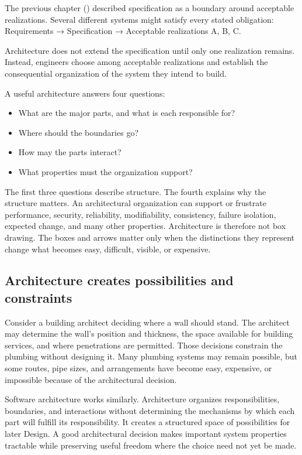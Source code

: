 The previous chapter (\citet{ch-specification}) described specification as a boundary around acceptable
realizations. Several different systems might satisfy every stated obligation: Requirements →
Specification → Acceptable realizations A, B, C.

Architecture does not extend the specification until only one realization remains. Instead,
engineers choose among acceptable realizations and establish the consequential organization of the
system they intend to build.

A useful architecture answers four questions:

\begin{itemize}
\tightlist
\item
  What are the major parts, and what is each responsible for?
\item
  Where should the boundaries go?
\item
  How may the parts interact?
\item
  What properties must the organization support?
\end{itemize}

The first three questions describe structure. The fourth explains why the structure matters. An
architectural organization can support or frustrate performance, security, reliability,
modifiability, consistency, failure isolation, expected change, and many other properties.
Architecture is therefore not box drawing. The boxes and arrows matter only when the distinctions
they represent change what becomes easy, difficult, visible, or expensive.

\subsection{Architecture creates possibilities and constraints}\label{sec-possibilities-constraints}

Consider a building architect deciding where a wall should stand.
The architect may determine the wall's position and thickness, the space available for building services, and where penetrations are permitted.
Those decisions constrain the plumbing without designing it.
Many plumbing systems may remain possible, but some routes, pipe sizes, and arrangements have become easy, expensive, or impossible because of the architectural decision.

Software architecture works similarly.
Architecture organizes responsibilities, boundaries, and interactions without determining the mechanisms by which each part will fulfill its responsibility.
It creates a structured space of possibilities for later Design.
A good architectural decision makes important system properties tractable while preserving useful freedom where the choice need not yet be made.

